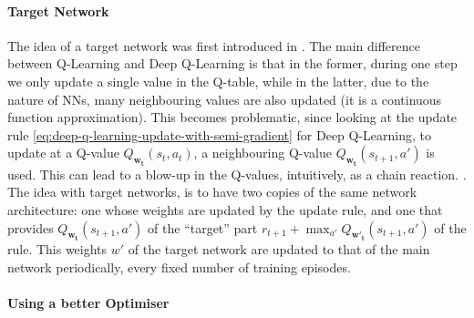 \paragraph{Target Network}


The idea of a target network was first introduced in \cite{argueta1992targetnetwork}. The main difference between Q-Learning and Deep Q-Learning is that in the former, during one step we only update a single value in the Q-table, while in the latter, due to the nature of NNs, many neighbouring values are also updated (it is a continuous function approximation). This becomes problematic, since looking at the update rule \ref{eq:deep-q-learning-update-with-semi-gradient} for Deep Q-Learning, to update at a Q-value $Q_{\mathbf{w_t}}(s_t, a_t)$, a neighbouring Q-value $Q_{\mathbf{w_t}}(s_{t+1}, a')$ is used. This can lead to a blow-up in the Q-values, intuitively, as a chain reaction. . The idea with target networks, is to have two copies of the same network architecture: one whose weights are updated by the update rule, and one that provides $Q_{\mathbf{w_t}}(s_{t+1}, a')$ of the ``target'' part $r_{t+1}+ \max_{a'} Q_{\mathbf{w'_t}}(s_{t+1}, a')$ of the rule. This weights $w'$ of the target network are updated to that of the main network periodically, every fixed number of training episodes.


\paragraph{Using a better Optimiser}


